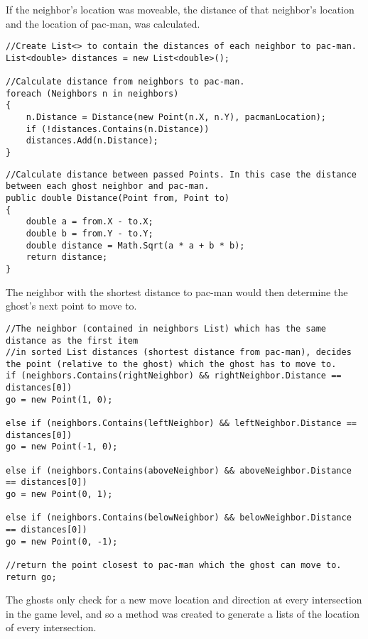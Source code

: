 If the neighbor’s location was moveable, the distance of that neighbor’s location and the location of pac-man, was calculated.

\begin{lstlisting}[caption=calculate distances,label=lst:distance]
//Create List<> to contain the distances of each neighbor to pac-man.
List<double> distances = new List<double>();

//Calculate distance from neighbors to pac-man.
foreach (Neighbors n in neighbors)
{
	n.Distance = Distance(new Point(n.X, n.Y), pacmanLocation);
	if (!distances.Contains(n.Distance))
	distances.Add(n.Distance);
}
\end{lstlisting}

\begin{lstlisting}[caption=Distance method,label=lst:distanceMethod]
//Calculate distance between passed Points. In this case the distance between each ghost neighbor and pac-man.
public double Distance(Point from, Point to)
{
	double a = from.X - to.X;
	double b = from.Y - to.Y;
	double distance = Math.Sqrt(a * a + b * b);
	return distance;
}
\end{lstlisting}

The neighbor with the shortest distance to pac-man would then determine the ghost’s next point to move to.

\begin{lstlisting}[caption=select point,label=lst:selectPoint]
//The neighbor (contained in neighbors List) which has the same distance as the first item
//in sorted List distances (shortest distance from pac-man), decides the point (relative to the ghost) which the ghost has to move to.
if (neighbors.Contains(rightNeighbor) && rightNeighbor.Distance == distances[0])
go = new Point(1, 0);

else if (neighbors.Contains(leftNeighbor) && leftNeighbor.Distance == distances[0])
go = new Point(-1, 0);

else if (neighbors.Contains(aboveNeighbor) && aboveNeighbor.Distance == distances[0])
go = new Point(0, 1);

else if (neighbors.Contains(belowNeighbor) && belowNeighbor.Distance == distances[0])
go = new Point(0, -1);

//return the point closest to pac-man which the ghost can move to.
return go;

\end{lstlisting}

The ghosts only check for a new move location and direction at every intersection in the game level, and so a method was created to generate a lists of the location of every intersection.


